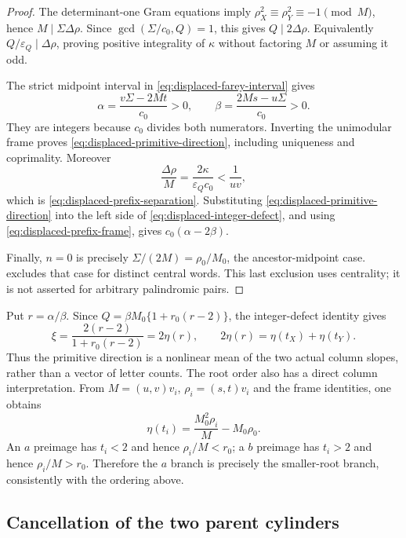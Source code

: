 \begin{proof}
The determinant-one Gram equations imply $\rho_X^2\equiv\rho_Y^2\equiv-1\pmod M$, hence $M\mid\Sigma\Delta\rho$. Since $\gcd(\Sigma/c_0,Q)=1$, this gives $Q\mid2\Delta\rho$. Equivalently $Q/\varepsilon_Q\mid\Delta\rho$, proving positive integrality of $\kappa$ without factoring $M$ or assuming it odd.

The strict midpoint interval in \eqref{eq:displaced-farey-interval} gives
$$
 \alpha=\frac{v\Sigma-2Mt}{c_0}>0,\qquad
 \beta=\frac{2Ms-u\Sigma}{c_0}>0.
$$
They are integers because $c_0$ divides both numerators. Inverting the unimodular frame proves \eqref{eq:displaced-primitive-direction}, including uniqueness and coprimality. Moreover
$$
 \frac{\Delta\rho}{M}=\frac{2\kappa}{\varepsilon_Q c_0}<\frac1{uv},
$$
which is \eqref{eq:displaced-prefix-separation}. Substituting \eqref{eq:displaced-primitive-direction} into the left side of \eqref{eq:displaced-integer-defect}, and using \eqref{eq:displaced-prefix-frame}, gives $c_0(\alpha-2\beta)$.

Finally, $n=0$ is precisely $\Sigma/(2M)=\rho_0/M_0$, the ancestor-midpoint case.  excludes that case for distinct central words. This last exclusion uses centrality; it is not asserted for arbitrary palindromic pairs.
\end{proof}

Put $r=\alpha/\beta$. Since $Q=\beta M_0\{1+r_0(r-2)\}$, the integer-defect identity gives
\begin{equation}
 \xi=\frac{2(r-2)}{1+r_0(r-2)}=2\eta(r),\qquad
 2\eta(r)=\eta(t_X)+\eta(t_Y).
 \label{eq:displaced-mean}
\end{equation}
Thus the primitive direction is a nonlinear mean of the two actual column slopes, rather than a vector of letter counts. The root order also has a direct column interpretation. From $M=(u,v)v_i$, $\rho_i=(s,t)v_i$ and the frame identities, one obtains
$$
 \eta(t_i)=\frac{M_0^2\rho_i}{M}-M_0\rho_0.
$$
An $a$ preimage has $t_i<2$ and hence $\rho_i/M<r_0$; a $b$ preimage has $t_i>2$ and hence $\rho_i/M>r_0$. Therefore the $a$ branch is precisely the smaller-root branch, consistently with the ordering above.

\subsection{Cancellation of the two parent cylinders}

